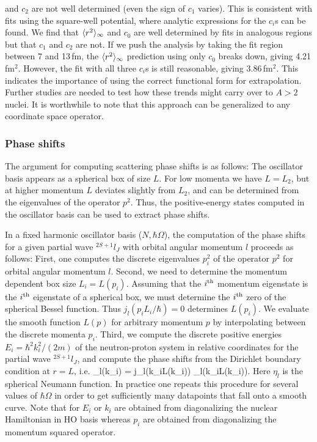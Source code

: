 	and $c_2$ are not well determined (even the sign of $c_1$
	varies).  This is consistent with
	fits using the square-well potential, where analytic expressions
	for the $c_i$s can be found.  We find that $\langle r^2 \rangle_{\infty}$
	and $c_0$ are well determined by fits in analogous
	regions but that $c_1$ and $c_2$ are not.
	If we push the analysis by taking the fit region between 7 and 13\,fm,
	the $\langle r^2 \rangle_{\infty}$ prediction using only $c_0$ breaks down, giving
	4.21\,fm$^2$.  However, the fit with all three $c_i$s is still
	reasonable, giving 3.86\,fm$^2$.  This indicates the importance of using
	the correct functional form for extrapolation.
	Further studies are needed to test how these trends might carry
	over to $A>2$ nuclei.  It is worthwhile to note that this approach can
	be generalized to any coordinate space operator.

	\subsubsection{Phase shifts}

	The argument for computing scattering phase shifts is as
	follows: The oscillator basis appears as a spherical box of size
	$L$.  For low momenta we have $L=L_2$, but at higher momentum $L$
	deviates slightly from $L_2$, and can be determined from the
	eigenvalues of the operator $p^2$.  Thus, the positive-energy states
	computed in the oscillator basis can be used to extract phase shifts.

	In a fixed harmonic oscillator basis ($N,\hbar\Omega$), the
	computation of the phase shifts for a given partial wave $^{2S+1}l_J$
	with orbital angular momentum $l$ proceeds as follows: First, one
	computes the discrete eigenvalues $p_i^2$ of the operator $p^2$ for
	orbital angular momentum $l$.  Second, we need to determine the
	momentum dependent box size $L_i=L(p_i)$.  Assuming that the $i^{\rm th}$
	momentum eigenstate is the $i^{\rm th}$ eigenstate of a
	spherical box, we must determine the $i^{\rm th}$ zero of the
	spherical Bessel function.  Thus $j_l(p_iL_i/\hbar) = 0 $ determines
	$L(p_i)$.  We evaluate the smooth function $ L(p)$ for arbitrary
	momentum $p$ by interpolating between the discrete momenta
	$p_i$.  Third, we compute the discrete positive energies $E_i =
	\hbar^2k_i^2/(2m)$ of the neutron-proton system in relative
	coordinates for the partial wave $^{2S+1}l_J$, and compute the phase
	shifts from the Dirichlet boundary condition at $r=L$, i.e.
	\beq
	\tan\delta_l(k_i) = { j_l(k_iL(\hbar k_i)) \over \eta_l(k_iL(\hbar k_i))}\;.
	\eeq
	Here $\eta_l$ is the spherical Neumann function.  In practice one
	repeats this procedure for several values of $\hbar\Omega$ in order to
	get sufficiently many datapoints that fall onto a smooth curve.
	Note that for $E_i$ or $k_i$ are obtained from diagonalizing the nuclear
	Hamiltonian in HO basis whereas $p_i$ are obtained from diagonalizing the
	momentum squared operator.

